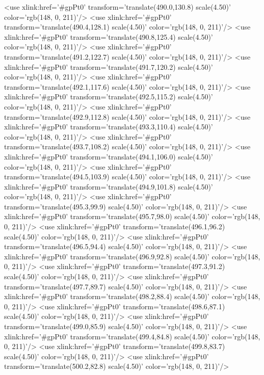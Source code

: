 	<use xlink:href='#gpPt0' transform='translate(490.0,130.8) scale(4.50)' color='rgb(148,   0, 211)'/>
	<use xlink:href='#gpPt0' transform='translate(490.4,128.1) scale(4.50)' color='rgb(148,   0, 211)'/>
	<use xlink:href='#gpPt0' transform='translate(490.8,125.4) scale(4.50)' color='rgb(148,   0, 211)'/>
	<use xlink:href='#gpPt0' transform='translate(491.2,122.7) scale(4.50)' color='rgb(148,   0, 211)'/>
	<use xlink:href='#gpPt0' transform='translate(491.7,120.2) scale(4.50)' color='rgb(148,   0, 211)'/>
	<use xlink:href='#gpPt0' transform='translate(492.1,117.6) scale(4.50)' color='rgb(148,   0, 211)'/>
	<use xlink:href='#gpPt0' transform='translate(492.5,115.2) scale(4.50)' color='rgb(148,   0, 211)'/>
	<use xlink:href='#gpPt0' transform='translate(492.9,112.8) scale(4.50)' color='rgb(148,   0, 211)'/>
	<use xlink:href='#gpPt0' transform='translate(493.3,110.4) scale(4.50)' color='rgb(148,   0, 211)'/>
	<use xlink:href='#gpPt0' transform='translate(493.7,108.2) scale(4.50)' color='rgb(148,   0, 211)'/>
	<use xlink:href='#gpPt0' transform='translate(494.1,106.0) scale(4.50)' color='rgb(148,   0, 211)'/>
	<use xlink:href='#gpPt0' transform='translate(494.5,103.9) scale(4.50)' color='rgb(148,   0, 211)'/>
	<use xlink:href='#gpPt0' transform='translate(494.9,101.8) scale(4.50)' color='rgb(148,   0, 211)'/>
	<use xlink:href='#gpPt0' transform='translate(495.3,99.9) scale(4.50)' color='rgb(148,   0, 211)'/>
	<use xlink:href='#gpPt0' transform='translate(495.7,98.0) scale(4.50)' color='rgb(148,   0, 211)'/>
	<use xlink:href='#gpPt0' transform='translate(496.1,96.2) scale(4.50)' color='rgb(148,   0, 211)'/>
	<use xlink:href='#gpPt0' transform='translate(496.5,94.4) scale(4.50)' color='rgb(148,   0, 211)'/>
	<use xlink:href='#gpPt0' transform='translate(496.9,92.8) scale(4.50)' color='rgb(148,   0, 211)'/>
	<use xlink:href='#gpPt0' transform='translate(497.3,91.2) scale(4.50)' color='rgb(148,   0, 211)'/>
	<use xlink:href='#gpPt0' transform='translate(497.7,89.7) scale(4.50)' color='rgb(148,   0, 211)'/>
	<use xlink:href='#gpPt0' transform='translate(498.2,88.4) scale(4.50)' color='rgb(148,   0, 211)'/>
	<use xlink:href='#gpPt0' transform='translate(498.6,87.1) scale(4.50)' color='rgb(148,   0, 211)'/>
	<use xlink:href='#gpPt0' transform='translate(499.0,85.9) scale(4.50)' color='rgb(148,   0, 211)'/>
	<use xlink:href='#gpPt0' transform='translate(499.4,84.8) scale(4.50)' color='rgb(148,   0, 211)'/>
	<use xlink:href='#gpPt0' transform='translate(499.8,83.7) scale(4.50)' color='rgb(148,   0, 211)'/>
	<use xlink:href='#gpPt0' transform='translate(500.2,82.8) scale(4.50)' color='rgb(148,   0, 211)'/>
